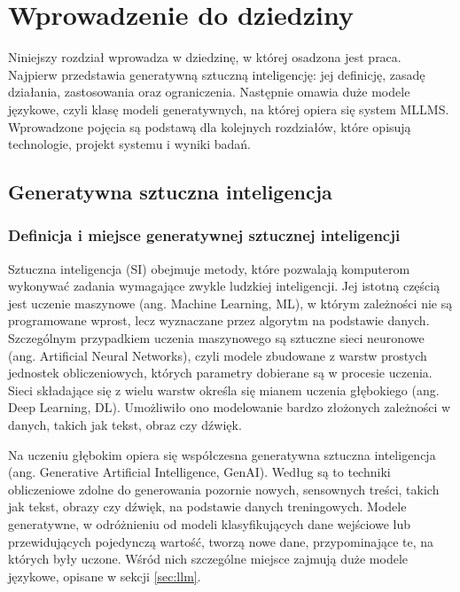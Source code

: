 \chapter{Wprowadzenie do dziedziny}

Niniejszy rozdział wprowadza w dziedzinę, w której osadzona jest praca. Najpierw przedstawia generatywną sztuczną inteligencję: jej definicję, zasadę działania, zastosowania oraz ograniczenia. Następnie omawia duże modele językowe, czyli klasę modeli generatywnych, na której opiera się system MLLMS. Wprowadzone pojęcia są podstawą dla kolejnych rozdziałów, które opisują technologie, projekt systemu i wyniki badań.

\section{Generatywna sztuczna inteligencja}

\subsection{Definicja i miejsce generatywnej sztucznej inteligencji}

Sztuczna inteligencja (SI) obejmuje metody, które pozwalają komputerom wykonywać zadania wymagające zwykle ludzkiej inteligencji. Jej istotną częścią jest uczenie maszynowe (ang. Machine Learning, ML), w którym zależności nie są programowane wprost, lecz wyznaczane przez algorytm na podstawie danych. Szczególnym przypadkiem uczenia maszynowego są sztuczne sieci neuronowe (ang. Artificial Neural Networks), czyli modele zbudowane z warstw prostych jednostek obliczeniowych, których parametry dobierane są w procesie uczenia. Sieci składające się z wielu warstw określa się mianem uczenia głębokiego (ang. Deep Learning, DL). Umożliwiło ono modelowanie bardzo złożonych zależności w danych, takich jak tekst, obraz czy dźwięk.

Na uczeniu głębokim opiera się współczesna generatywna sztuczna inteligencja (ang. Generative Artificial Intelligence, GenAI). Według \cite{feuerriegel_generative_ai} są to techniki obliczeniowe zdolne do generowania pozornie nowych, sensownych treści, takich jak tekst, obrazy czy dźwięk, na podstawie danych treningowych. Modele generatywne, w odróżnieniu od modeli klasyfikujących dane wejściowe lub przewidujących pojedynczą wartość, tworzą nowe dane, przypominające te, na których były uczone. Wśród nich szczególne miejsce zajmują duże modele językowe, opisane w sekcji \ref{sec:llm}.

